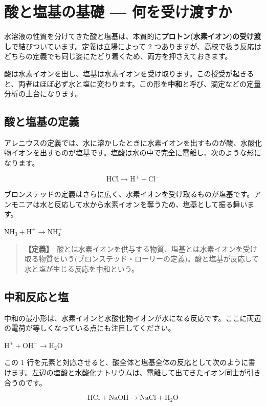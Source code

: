 \documentclass{article}
\begin{document}
\section{酸と塩基の基礎 — 何を受け渡すか}

水溶液の性質を分けてきた酸と塩基は、本質的に\textbf{プロトン(水素イオン)の受け渡し}で結びついています。定義は立場によって 2 つありますが、高校で扱う反応はどちらの定義でも同じ姿にたどり着くため、両方を押さえておきます。

酸は水素イオンを出し、塩基は水素イオンを受け取ります。この授受が起きると、両者はほぼ必ず水と塩に変わります。この形を\textbf{中和}と呼び、滴定などの定量分析の土台になります。

\subsection{酸と塩基の定義}

アレニウスの定義では、水に溶かしたときに水素イオンを出すものが酸、水酸化物イオンを出すものが塩基です。塩酸は水の中で完全に電離し、次のような形になります。

\[ \mathrm{HCl} \rightarrow \mathrm{H}^{+} + \mathrm{Cl}^{-} \]

ブロンステッドの定義はさらに広く、水素イオンを受け取るものが塩基です。アンモニアは水と反応して水から水素イオンを奪うため、塩基として振る舞います。

\( \mathrm{NH}_{3} + \mathrm{H}^{+} \rightarrow \mathrm{NH}_{4}^{+} \)

\begin{quote}
\textbf{【定義】}\ 酸とは水素イオンを供与する物質、塩基とは水素イオンを受け取る物質をいう(ブロンステッド・ローリーの定義)。酸と塩基が反応して水と塩が生じる反応を中和という。
\end{quote}

\subsection{中和反応と塩}

中和の最小形は、水素イオンと水酸化物イオンが水になる反応です。ここに両辺の電荷が等しくなっている点にも注目してください。

\( \mathrm{H}^{+} + \mathrm{OH}^{-} \rightarrow \mathrm{H}_{2}\mathrm{O} \)

この 1 行を元素と対応させると、酸全体と塩基全体の反応として次のように書けます。左辺の塩酸と水酸化ナトリウムは、電離して出てきたイオン同士が引き合うのです。

\[ \mathrm{HCl} + \mathrm{NaOH} \rightarrow \mathrm{NaCl} + \mathrm{H}_{2}\mathrm{O} \]
\end{document}
